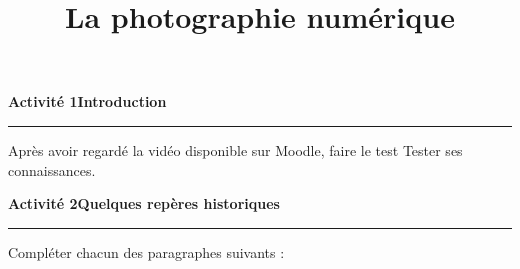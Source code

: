 \documentclass[a4paper]{article}
\begin{document}
\title{La photographie numérique}

\pagestyle{empty}

\date{}
\author{}

\maketitle{}

\thispagestyle{empty}
\noindent\textbf{Activité 1}\hfill{}\textbf{Introduction}
\smallskip
\hrule
\medskip

Après avoir regardé la vidéo disponible sur Moodle, faire le test \og{}Tester ses connaissances\fg{}.

\bigskip

\noindent\textbf{Activité 2}\hfill{}\textbf{Quelques repères historiques}
\smallskip
\hrule
\medskip

Compléter chacun des paragraphes suivants :
\end{document}
